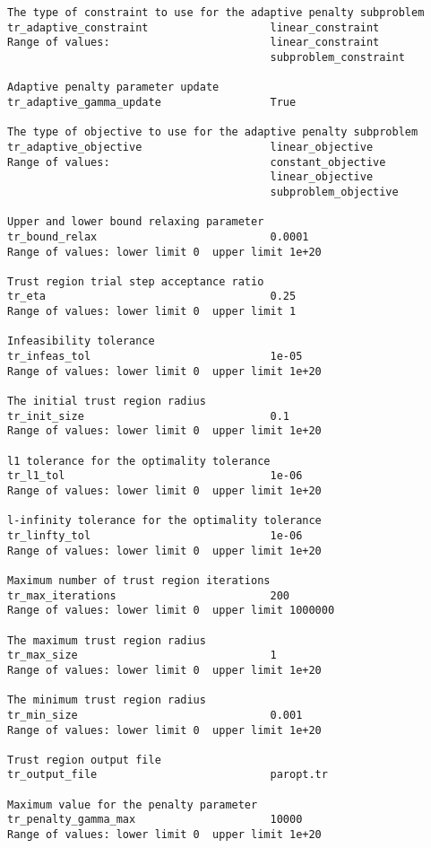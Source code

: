 \documentclass[12pt]{article}
\begin{document}
{\begin{verbatim}
The type of constraint to use for the adaptive penalty subproblem
tr_adaptive_constraint                   linear_constraint
Range of values:                         linear_constraint
                                         subproblem_constraint

Adaptive penalty parameter update
tr_adaptive_gamma_update                 True

The type of objective to use for the adaptive penalty subproblem
tr_adaptive_objective                    linear_objective
Range of values:                         constant_objective
                                         linear_objective
                                         subproblem_objective

Upper and lower bound relaxing parameter
tr_bound_relax                           0.0001
Range of values: lower limit 0  upper limit 1e+20

Trust region trial step acceptance ratio
tr_eta                                   0.25
Range of values: lower limit 0  upper limit 1

Infeasibility tolerance
tr_infeas_tol                            1e-05
Range of values: lower limit 0  upper limit 1e+20

The initial trust region radius
tr_init_size                             0.1
Range of values: lower limit 0  upper limit 1e+20

l1 tolerance for the optimality tolerance
tr_l1_tol                                1e-06
Range of values: lower limit 0  upper limit 1e+20

l-infinity tolerance for the optimality tolerance
tr_linfty_tol                            1e-06
Range of values: lower limit 0  upper limit 1e+20

Maximum number of trust region iterations
tr_max_iterations                        200
Range of values: lower limit 0  upper limit 1000000

The maximum trust region radius
tr_max_size                              1
Range of values: lower limit 0  upper limit 1e+20

The minimum trust region radius
tr_min_size                              0.001
Range of values: lower limit 0  upper limit 1e+20

Trust region output file
tr_output_file                           paropt.tr

Maximum value for the penalty parameter
tr_penalty_gamma_max                     10000
Range of values: lower limit 0  upper limit 1e+20


\end{verbatim}}
\end{document}
